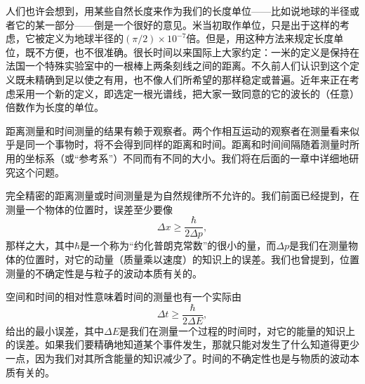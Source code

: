 人们也许会想到，用某些自然长度来作为我们的长度单位——比如说地球的半径或者它的某一部分——倒是一个很好的意见。米当初取作单位，只是出于这样的考虑，它被定义为地球半径的$(\pi/2)\times10^{-7}$倍。但是，用这种方法来规定长度单位，既不方便，也不很准确。很长时间以来国际上大家约定：一米的定义是保持在法国一个特殊实验室中的一根棒上两条刻线之间的距离。不久前人们认识到这个定义既未精确到足以使之有用，也不像人们所希望的那样稳定或普遍。近年来正在考虑采用一个新的定义，即选定一根光谱线，把大家一致同意的它的波长的（任意）倍数作为长度的单位。

距离测量和时间测量的结果有赖于观察者。两个作相互运动的观察者在测量看来似乎是同一个事物时，将不会得到同样的距离和时间。距离和时间间隔随着测量时所用的坐标系（或“参考系”）不同而有不同的大小。我们将在后面的一章中详细地研究这个问题。

完全精密的距离测量或时间测量是为自然规律所不允许的。我们前面已经提到，在测量一个物体的位置时，误差至少要像
\begin{equation*}
\Delta x\geq\frac{\hbar}{2\Delta p},
\end{equation*}
那样之大，其中$\hbar$是一个称为“约化普朗克常数”的很小的量，而$\Delta p$是我们在测量物体的位置时，对它的动量（质量乘以速度）的知识上的误差。我们也曾提到，位置测量的不确定性是与粒子的波动本质有关的。

空间和时间的相对性意味着时间的测量也有一个实际由
\begin{equation*}
\Delta t\geq\frac{\hbar}{2\Delta E},
\end{equation*}
给出的最小误差，其中$\Delta E$是我们在测量一个过程的时间时，对它的能量的知识上的误差。如果我们要精确地知道某个事件发生，那就只能对发生了什么知道得更少一点，因为我们对其所含能量的知识减少了。时间的不确定性也是与物质的波动本质有关的。

